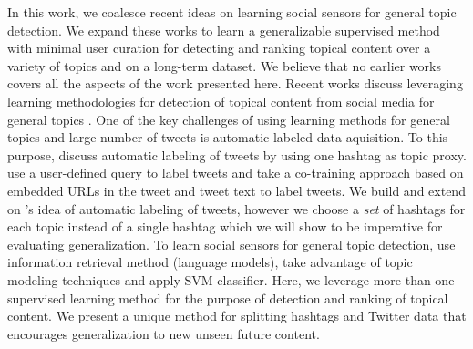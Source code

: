 In this work, we coalesce recent ideas on learning social sensors for general topic detection. We expand these works to learn a generalizable supervised method with minimal user curation for detecting and ranking topical content over a variety of topics and on a long-term dataset. We believe that no earlier works covers all the aspects of the work presented here.
Recent works discuss leveraging learning methodologies for detection of topical content from social media for general topics \citep{lin2011smoothing,yang2014large,magdy}. One of the key challenges of using learning methods for general topics and large number of tweets is automatic labeled data aquisition. To this purpose, \cite{lin2011smoothing} discuss automatic labeling of tweets by using one hashtag as topic proxy. \cite{magdy} use a user-defined query to label tweets and \cite{yang2014large} take a co-training approach based on embedded URLs in the tweet and tweet text to label tweets. We build and extend on \citep{lin2011smoothing}'s idea of automatic labeling of tweets, however we choose a \emph{set} of hashtags for each topic instead of a single hashtag which we will show to be imperative for evaluating generalization. To learn social sensors for general topic detection, \citep{lin2011smoothing} use information retrieval method (language models), \cite{yang2014large} take advantage of topic modeling techniques and \cite{magdy} apply SVM classifier. Here, we leverage more than one supervised learning method for the purpose of detection and ranking of topical content. We present a unique method for splitting hashtags and Twitter data that encourages generalization to new unseen future content. 
